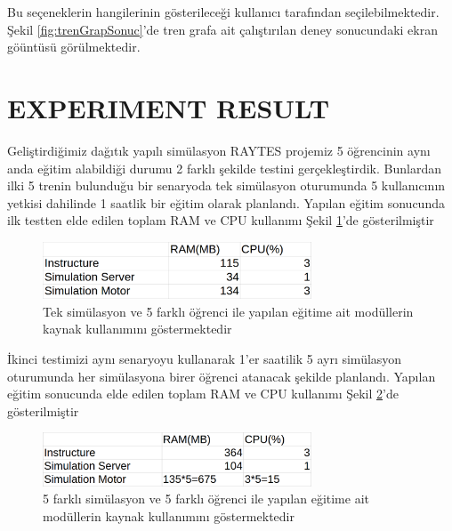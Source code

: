 \documentclass[conference]{IEEEtran}
\begin{document}
Bu seçeneklerin hangilerinin gösterileceği kullanıcı tarafından seçilebilmektedir.
Şekil \ref{fig:trenGrapSonuc}'de tren grafa ait çalıştırılan deney sonucundaki ekran göüntüsü görülmektedir.

\section{EXPERIMENT RESULT}
Geliştirdiğimiz dağıtık yapılı simülasyon RAYTES projemiz 5 öğrencinin aynı anda eğitim alabildiği durumu 2 farklı şekilde testini gerçekleştirdik. Bunlardan ilki 5 trenin bulunduğu bir senaryoda tek simülasyon oturumunda 5 kullanıcının yetkisi dahilinde 1 saatlik bir eğitim olarak planlandı. Yapılan eğitim sonucunda ilk testten elde edilen toplam RAM ve CPU kullanımı Şekil \ref{fig:hepsibir}'de gösterilmiştir


\begin{figure}[h!]
  \centering
  \includegraphics[width=8cm]{hepsibir.png}
  \caption{Tek simülasyon ve 5 farklı öğrenci ile yapılan eğitime ait modüllerin kaynak kullanımını göstermektedir}\label{fig:hepsibir}
  
\end{figure}

İkinci testimizi aynı senaryoyu kullanarak 1'er saatilik 5 ayrı simülasyon oturumunda her simülasyona birer öğrenci atanacak şekilde planlandı. Yapılan eğitim sonucunda elde edilen toplam RAM ve CPU kullanımı Şekil \ref{fig:hepsiayri}'de gösterilmiştir

\begin{figure}[h!]
  \centering
  \includegraphics[width=8cm]{hepsiayri.png}
  \caption{5 farklı simülasyon ve 5 farklı öğrenci ile yapılan eğitime ait modüllerin kaynak kullanımını göstermektedir}\label{fig:hepsiayri}
  
\end{figure}
\end{document}
